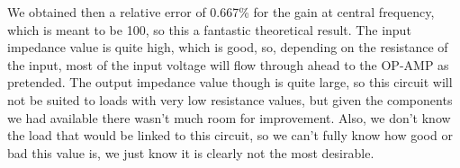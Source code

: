 We obtained then a relative error of 0.667\% for the gain at central frequency, which is meant to be 100, so this a fantastic theoretical result. The input impedance value is quite high, which is good, so, depending on the resistance of the input, most of the input voltage will flow through ahead to the OP-AMP as pretended. The output impedance value though is quite large, so this circuit will not be suited to loads with very low resistance values, but given the components we had available there wasn't much room for improvement. Also, we don't know the load that would be linked to this circuit, so we can't fully know how good or bad this value is, we just know it is clearly not the most desirable.
